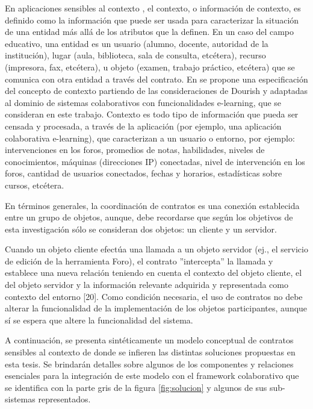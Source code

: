 En aplicaciones sensibles al contexto \cite{cap1.6}, el contexto, o información
de contexto, es definido como la información que puede ser usada
para caracterizar la situación de una entidad más allá de los atributos que la
definen. En un caso del campo educativo, una entidad es un usuario (alumno, docente, autoridad de la institución),
lugar (aula, biblioteca, sala de consulta, etcétera), recurso (impresora, fax, etcétera),
u objeto (examen, trabajo práctico, etcétera) que se comunica con otra entidad a
través del contrato. En \cite{cap1.2} se propone una especificación del concepto
de contexto partiendo de las consideraciones de Dourish \cite{cap1.20} y
adaptadas al dominio de sistemas colaborativos con funcionalidades e-learning,
que se consideran en este trabajo.
Contexto es todo tipo de información que pueda ser censada y procesada, a través
de la aplicación (por ejemplo, una aplicación colaborativa e-learning), que
caracterizan a un usuario o entorno, por
ejemplo: intervenciones en los foros, promedios de notas, habilidades, niveles
de conocimientos, máquinas (direcciones IP) conectadas, nivel de intervención en
los foros, cantidad de usuarios conectados, fechas y horarios, estadísticas
sobre cursos, etcétera.

En términos generales, la coordinación de contratos es una conexión establecida entre un grupo de objetos, aunque, debe recordarse que según los objetivos de esta investigación sólo se consideran dos objetos: un cliente y un servidor.

Cuando un objeto cliente efectúa una llamada a un objeto servidor (ej., el
servicio de edición de la herramienta Foro), el contrato ”intercepta” la
llamada y establece una nueva relación teniendo en cuenta el contexto del
objeto cliente, el del objeto servidor y la información relevante adquirida
y representada como contexto del entorno [20]. Como condición necesaria, el uso
de contratos no debe alterar la funcionalidad de la implementación de los
objetos participantes, aunque sí se espera que altere la funcionalidad del
sistema.

A continuación, se presenta sintéticamente un modelo conceptual de contratos sensibles
al contexto de donde se infieren las distintas soluciones propuestas en esta
tesis. Se brindarán detalles sobre algunos de los componentes y relaciones
esenciales para la integración de este modelo con el framework colaborativo que
se identifica con la parte gris de la figura \ref{fig:solucion} y algunos de
sus sub-sistemas representados.


